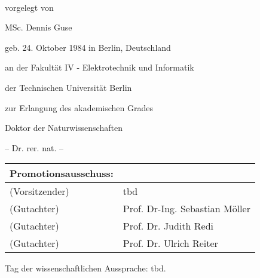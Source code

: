 \begin{titlepage}
    \begin{addmargin}[-1cm]{-3cm}
    \begin{center}
        \large  

        \hfill

        \vfill

        \begingroup
            \color{Maroon}\spacedallcaps{\myTitle} \\ \bigskip
        \endgroup

				vorgelegt von
				
				\vspace{0.5cm}	
				MSc. Dennis Guse
				
				geb. 24. Oktober 1984 in Berlin, Deutschland
				\vspace{1.5cm}				
				
				an der Fakultät IV - Elektrotechnik und Informatik
				
				der Technischen Universität Berlin
				
				zur Erlangung des akademischen Grades

				\vspace{0.5cm}
				Doktor der Naturwissenschaften
				
				-- Dr. rer. nat. --

				\vspace{1.5cm}
				
				\begin{table}[h!]
				\centering
				\begin{tabular}{ll}
				Promotionsausschuss: \\
				\hline				
				(Vorsitzender) & tbd \\
				(Gutachter)	& Prof. Dr-Ing. Sebastian Möller \\
				(Gutachter)	& Prof. Dr. Judith Redi \\
				(Gutachter)	& Prof. Dr. Ulrich Reiter \\
				\end{tabular}
				\end{table}
				
				\vspace{1cm}				
				Tag der wissenschaftlichen Aussprache: tbd.


\end{center}
\end{addmargin}
\end{titlepage}
